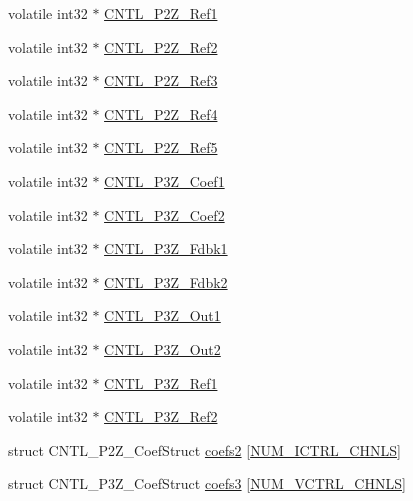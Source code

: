 \begin{DoxyCompactItemize}
\item 
volatile int32 $\ast$ \hyperlink{a00010_a98527ce76f5175fa2933d46f324d85fb}{C\-N\-T\-L\-\_\-P2\-Z\-\_\-\-Ref1}
\item 
volatile int32 $\ast$ \hyperlink{a00010_a9bf1756a901a3a74d9f43a51f85cede4}{C\-N\-T\-L\-\_\-P2\-Z\-\_\-\-Ref2}
\item 
volatile int32 $\ast$ \hyperlink{a00010_a859e9bbd5bc82f1b42863a93e4f992af}{C\-N\-T\-L\-\_\-P2\-Z\-\_\-\-Ref3}
\item 
volatile int32 $\ast$ \hyperlink{a00010_af54c55f228deb8189c44282a94a870c1}{C\-N\-T\-L\-\_\-P2\-Z\-\_\-\-Ref4}
\item 
volatile int32 $\ast$ \hyperlink{a00010_abd3b240e2d3f7d3f4f717066ee8efd3e}{C\-N\-T\-L\-\_\-P2\-Z\-\_\-\-Ref5}
\item 
volatile int32 $\ast$ \hyperlink{a00010_a41005c53e7c439f0af28e140f7d3d0ed}{C\-N\-T\-L\-\_\-P3\-Z\-\_\-\-Coef1}
\item 
volatile int32 $\ast$ \hyperlink{a00010_a7a74642d86ae9a823f58f49db57f8bc8}{C\-N\-T\-L\-\_\-P3\-Z\-\_\-\-Coef2}
\item 
volatile int32 $\ast$ \hyperlink{a00010_a361372a23d9146cd2d077e6c843ec47e}{C\-N\-T\-L\-\_\-P3\-Z\-\_\-\-Fdbk1}
\item 
volatile int32 $\ast$ \hyperlink{a00010_a4676fa58f77cab7e1c4e86255049dfe7}{C\-N\-T\-L\-\_\-P3\-Z\-\_\-\-Fdbk2}
\item 
volatile int32 $\ast$ \hyperlink{a00010_acb0edbb1cfd2fb0e63ac2eb233dcd577}{C\-N\-T\-L\-\_\-P3\-Z\-\_\-\-Out1}
\item 
volatile int32 $\ast$ \hyperlink{a00010_a92dd8eabeed10eaaaf60887d9bcbd76d}{C\-N\-T\-L\-\_\-P3\-Z\-\_\-\-Out2}
\item 
volatile int32 $\ast$ \hyperlink{a00010_a6ebe91dab023eff56cade0eddcd3e96d}{C\-N\-T\-L\-\_\-P3\-Z\-\_\-\-Ref1}
\item 
volatile int32 $\ast$ \hyperlink{a00010_a589e93bad0b8ba223e32ce590bba816b}{C\-N\-T\-L\-\_\-P3\-Z\-\_\-\-Ref2}
\item 
struct C\-N\-T\-L\-\_\-P2\-Z\-\_\-\-Coef\-Struct \hyperlink{a00010_a0e862b208ff3b2bb45fcfce1ccd74cd2}{coefs2} \mbox{[}\hyperlink{a00031_a69b2e41c3deaae85991311202c4a1a14}{N\-U\-M\-\_\-\-I\-C\-T\-R\-L\-\_\-\-C\-H\-N\-L\-S}\mbox{]}
\item 
struct C\-N\-T\-L\-\_\-P3\-Z\-\_\-\-Coef\-Struct \hyperlink{a00010_a84b8a9f9bc8749e7ad42eea593f858c4}{coefs3} \mbox{[}\hyperlink{a00031_a42a316162edffd07a32e68a889760c06}{N\-U\-M\-\_\-\-V\-C\-T\-R\-L\-\_\-\-C\-H\-N\-L\-S}\mbox{]}
\end{DoxyCompactItemize}


